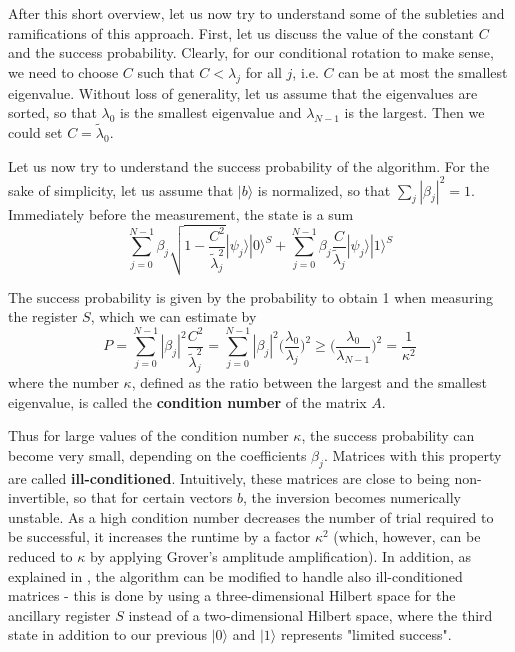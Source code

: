 \documentclass[a4paper, draft]{article}
\theoremstyle{own}
\theoremstyle{remark}
\begin{document}
After this short overview, let us now try to understand some of the subleties and ramifications of this approach. First, let us discuss the value of the constant $C$ and the success probability. Clearly, for our conditional rotation to make sense, we need to choose $C$ such that $C < \lambda_j$ for all $j$, i.e. $C$ can be at most the smallest eigenvalue. Without loss of generality, let us assume that the eigenvalues are sorted, so that $\lambda_0$ is the smallest eigenvalue and $\lambda_{N-1}$ is the largest. Then we could set $C = \tilde{\lambda}_0$. 

Let us now try to understand the success probability of the algorithm. For the sake of simplicity, let us assume that $|b \rangle$ is normalized, so that $\sum_j |\beta_j|^2 = 1$. Immediately before the measurement, the state is a sum
$$
\sum_{j=0}^{N-1} \beta_j \sqrt{1 - \frac{C^2}{\tilde{\lambda}_j^2}} |\psi_j \rangle |0 \rangle^S       
+ 
\sum_{j=0}^{N-1} \beta_j \frac{C}{\tilde{\lambda}_j} |\psi_j  \rangle
 |1 \rangle^S    
$$

The success probability is given by the probability to obtain 1 when measuring the register $S$, which we can estimate by
$$
P = \sum_{j=0}^{N-1} |\beta_j|^2 \frac{C^2}{\tilde{\lambda}_j^2} = \sum_{j=0}^{N-1} |\beta_j|^2 \big( \frac{\lambda_0}{\lambda_j} \big)^2 \geq \big( \frac{\lambda_0}{\lambda_{N-1}} \big)^2 = \frac{1}{\kappa^2}
$$
where the number $\kappa$, defined as the ratio between the largest and the smallest eigenvalue, is called the {\bf condition number} of the matrix $A$. 

Thus for large values of the condition number $\kappa$, the success probability can become very small, depending on the coefficients $\beta_j$. Matrices with this property are called {\bf ill-conditioned}. Intuitively, these matrices are close to being non-invertible, so that for certain vectors $b$, the inversion becomes numerically unstable. As a high condition number decreases the number of trial required to be successful, it increases the runtime by a factor $\kappa^2$ (which, however, can be reduced to $\kappa$ by applying Grover's amplitude amplification). In addition, as explained in \cite{HHL2009}, the algorithm can be modified to handle also ill-conditioned matrices - this is done by using a three-dimensional Hilbert space for the ancillary register $S$ instead of a two-dimensional Hilbert space, where the third state in addition to our previous $|0 \rangle$ and $|1 \rangle$ represents "limited success". 
\end{document}
